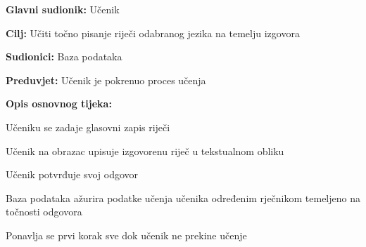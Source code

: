 					\noindent {}
					\begin{packed_item}
	
						\item \textbf{Glavni sudionik: }Učenik
						\item  \textbf{Cilj:} Učiti točno pisanje riječi odabranog jezika na temelju izgovora
						\item  \textbf{Sudionici:} Baza podataka
						\item  \textbf{Preduvjet:} Učenik je pokrenuo proces učenja
						\item  \textbf{Opis osnovnog tijeka:}
						
						\item[] \begin{packed_enum}
	
							\item Učeniku se zadaje glasovni zapis riječi
							\item Učenik na obrazac upisuje izgovorenu riječ u tekstualnom obliku
							\item Učenik potvrđuje svoj odgovor
							\item Baza podataka ažurira podatke učenja učenika određenim rječnikom temeljeno na točnosti odgovora
							\item Ponavlja se prvi korak sve dok učenik ne prekine učenje
						\end{packed_enum}
						
					\end{packed_item}

